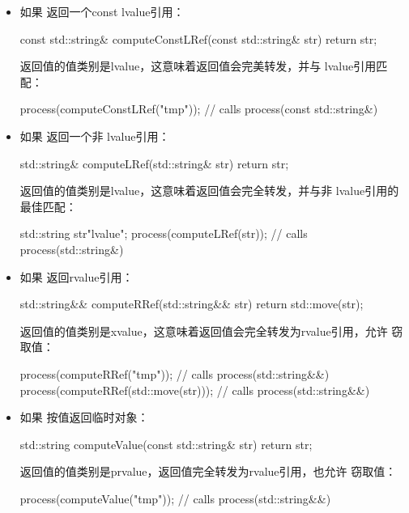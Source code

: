 \begin{itemize}
	\item 如果  返回一个const lvalue引用：

\begin{cppcode}
const std::string& computeConstLRef(const std::string& str) {
	return str;
}
\end{cppcode}
返回值的值类别是lvalue，这意味着返回值会完美转发，并与  lvalue引用匹配：

\begin{cppcode}
process(computeConstLRef("tmp")); // calls process(const std::string&)
\end{cppcode}
\item 如果  返回一个非  lvalue引用：

\begin{cppcode}
std::string& computeLRef(std::string& str) {
	return str;
}
\end{cppcode}
返回值的值类别是lvalue，这意味着返回值会完全转发，并与非  lvalue引用的最佳匹配：

\begin{cppcode}
std::string str{"lvalue"};
process(computeLRef(str)); // calls process(std::string&)
\end{cppcode}
\item 如果  返回rvalue引用：

\begin{cppcode}
std::string&& computeRRef(std::string&& str) {
	return std::move(str);
}
\end{cppcode}
返回值的值类别是xvalue，这意味着返回值会完全转发为rvalue引用，允许  窃取值：

\begin{cppcode}
process(computeRRef("tmp")); // calls process(std::string&&)
process(computeRRef(std::move(str))); // calls process(std::string&&)
\end{cppcode}
\item 如果  按值返回临时对象：

\begin{cppcode}
std::string computeValue(const std::string& str) {
	return str;
}
\end{cppcode}
返回值的值类别是prvalue，返回值完全转发为rvalue引用，也允许  窃取值：

\begin{cppcode}
process(computeValue("tmp")); // calls process(std::string&&)
\end{cppcode}
\end{itemize}


